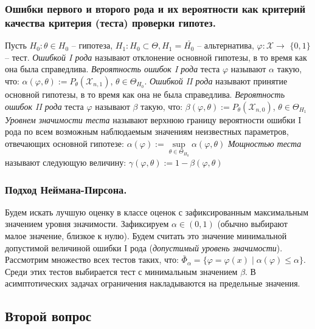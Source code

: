\documentclass{article}
\begin{document}
    \subsubsection{Ошибки первого и второго рода и их вероятности как критерий качества критерия (теста) проверки гипотез.}
        Пусть $H_0: \theta \in H_0$ -- гипотеза, $H_1: H_0 \subset \Theta, H_1 = \bar{H_0}$ -- альтернатива, $\varphi: \mathcal{X} \xrightarrow{}$ $\{0, 1\}$ -- тест.
        \newline
        \textit{Ошибкой I рода} называют отклонение основной гипотезы, в то время как она была справедлива.
        \newline
        \textit{Вероятность ошибок I рода} теста $\varphi$ называют $\alpha$ такую, что: $\alpha(\varphi, \theta) := P_{\theta}(\mathcal{X}_{n, 1})$, $\theta \in \Theta_{H_0}$.
        \newline
        \textit{Ошибкой II рода} называют принятие основной гипотезы, в то время как она не была справедлива.
        \newline
        \textit{Вероятность ошибок II рода} теста $\varphi$ называют $\beta$ такую, что: $\beta(\varphi, \theta) := P_{\theta}(\mathcal{X}_{n, 0})$, $\theta \in \Theta_{H_1}$
        \newline
        \textit{Уровнем значимости теста} называют верхнюю границу вероятности ошибки I рода по всем возможным наблюдаемым значениям неизвестных параметров, отвечающих основной гипотезе: $\alpha(\varphi) := \sup\limits_{\theta \in \Theta_{H_0}} \alpha(\varphi, \theta)$
        \textit{Мощностью теста} называют следующую величину: $\gamma(\varphi, \theta) := 1 - \beta(\varphi, \theta)$
    \subsubsection{Подход Неймана-Пирсона.}  
        Будем искать лучшую оценку в классе оценок с зафиксированным максимальным значением уровня значимости. Зафиксируем $\alpha \in (0, 1)$ (обычно выбирают малое значение, близкое к нулю). Будем считать это значение минимальной допустимой величиной ошибки I рода (\textit{допустимый уровень значимости}).
        Рассмотрим множество всех тестов таких, что: $\bar{\Phi}_\alpha = \{\varphi = \varphi(x) \mid \alpha(\varphi) \leqslant \alpha\}$. Среди этих тестов выбирается тест с минимальным значением $\beta$. В асимптотических задачах ограничения накладываются на предельные значения.
    \subsection{Второй вопрос}
\end{document}
